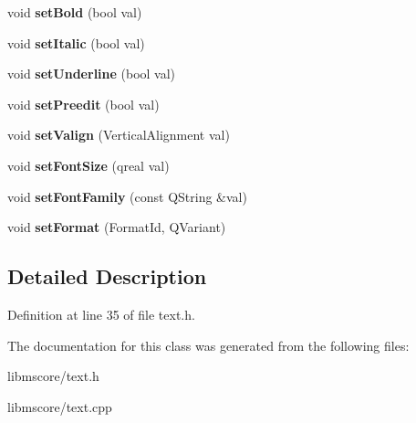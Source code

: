\begin{DoxyCompactItemize}
void {\bfseries set\+Bold} (bool val)
\item 
\mbox{\label{class_ms_1_1_char_format_abdd19726ab3400092a414e775c72a57c}} 
void {\bfseries set\+Italic} (bool val)
\item 
\mbox{\label{class_ms_1_1_char_format_a9e349cbb1e2203ed902afde90cbb729e}} 
void {\bfseries set\+Underline} (bool val)
\item 
\mbox{\label{class_ms_1_1_char_format_af27d1b872df5e7e377424dfa76912915}} 
void {\bfseries set\+Preedit} (bool val)
\item 
\mbox{\label{class_ms_1_1_char_format_ac861f1fda72cb1eb0f9f381442804ad4}} 
void {\bfseries set\+Valign} (Vertical\+Alignment val)
\item 
\mbox{\label{class_ms_1_1_char_format_a76e54ca217e273ffc029582d2d1c9577}} 
void {\bfseries set\+Font\+Size} (qreal val)
\item 
\mbox{\label{class_ms_1_1_char_format_aee383b062cb8b0fa603bebcf8bd80407}} 
void {\bfseries set\+Font\+Family} (const Q\+String \&val)
\item 
\mbox{\label{class_ms_1_1_char_format_a9be26122d40206f79c1bf5bdd5e2dc3a}} 
void {\bfseries set\+Format} (Format\+Id, Q\+Variant)
\end{DoxyCompactItemize}


\subsection{Detailed Description}


Definition at line 35 of file text.\+h.



The documentation for this class was generated from the following files\+:\begin{DoxyCompactItemize}
\item 
libmscore/text.\+h\item 
libmscore/text.\+cpp\end{DoxyCompactItemize}
